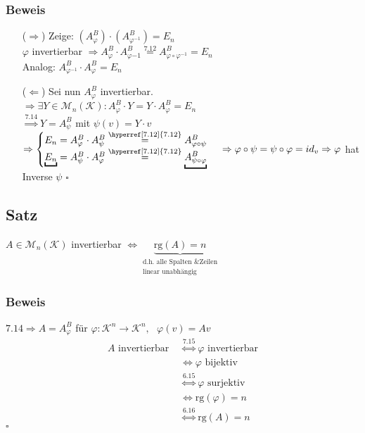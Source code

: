 \documentclass[12pt,titlepage, pdf]{article}
\newcommand{\K}{\mathcal{K}}
\newcommand{\M}{\mathcal{M}}
\newcommand{\rg}{\textrm{rg}}
\newcommand{\qed}{\hfill$\square$}
\renewcommand{\>}{\rightarrow}
\renewcommand{\*}{\cdot}
\renewcommand{\phi}{\varphi}
\begin{document}
\subsubsection*{Beweis}
\begin{itemize}
	\item[($\Rightarrow$)] Zeige: $(A_\phi^B) \cdot (A_{\phi^{-1}}^B) = E_n$\\
	$\phi$ invertierbar $\Rightarrow A_\phi^B \cdot A_{\phi{-1}}^B \overset{\hyperref[7.12]{7.12}}{=} A_{\phi \circ \phi^{-1}}^B = E_n$\\
	Analog: $A_{\phi^{-1}}^B \cdot A_\phi^B = E_n$
	\item[($\Leftarrow$)] Sei nun $A_\phi^B$ invertierbar. \\
	$\Rightarrow \exists Y \in \M_n(\K): A_\phi^B \cdot Y = Y \cdot A_\phi^B = E_n$\\
	$\overset{\hyperref[7.14]{7.14}}{\Rightarrow} Y = A_\psi^B$ mit $\psi(v) = Y\*v$\\
	$\Rightarrow \begin{cases}
	E_n = A_\phi^B \cdot A_\psi^B \overset{\hyperref[7.12]{7.12}}{=} A_{\phi \circ \psi}^B\\
	\underbracket{E_n} = A_\psi^B \cdot A_\phi^B \overset{\hyperref[7.12]{7.12}}{=} \underbracket{A_{\psi \circ \phi}^B}
	\end{cases}\\
	\Rightarrow \phi \circ \psi = \psi \circ \phi = id_v\\
	\Rightarrow \phi$ hat Inverse $\psi$ \qed
\end{itemize}
\subsection{Satz}
\label{7.16}
$A \in \M_n(\K)$ invertierbar $\Leftrightarrow \underbrace{\rg(A) = n}_{\substack{\text{d.h. alle Spalten \& Zeilen}\\\text{linear unabhängig}}}$
\subsubsection*{Beweis}
$\hyperref[7.14]{7.14} \Rightarrow A = A_\phi^B$ für $\phi:\K^n \rightarrow \K^n,~~~ \phi(v) = Av$\\
\begin{align*}
A \text{ invertierbar } &\overset{\hyperref[7.15]{7.15}}{\Leftrightarrow} \phi \text{ invertierbar} \\
&\Leftrightarrow \phi \text{ bijektiv }\\
&\overset{\hyperref[6.15]{6.15}}{\Leftrightarrow} \phi \text{ surjektiv}\\
&\Leftrightarrow \rg(\phi) = n\\
&\overset{\hyperref[6.16]{6.16}}{\Leftrightarrow} \rg(A) = n
\end{align*}
\qed
\end{document}
